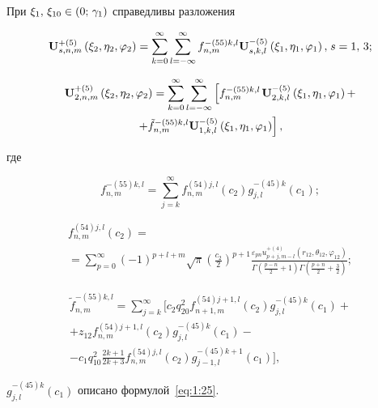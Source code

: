\begin{theorem}
При ${\xi _1},{\mkern 1mu} {\kern 1pt} {\xi _{10}} \in (0;{\mkern 1mu} {\kern 1pt} {\gamma _1})$ справедливы разложения

\begin{equation}\label{eq:1:52}
{\bf{U}}_{s,n,m}^{ + (5)}\left( {{\xi _2},{\eta _2},{\varphi _2}} \right) = \sum\limits_{k = 0}^\infty  {\sum\limits_{l =  - \infty }^\infty  {f_{n,m}^{ - (55)k,l}} } {\bf{U}}_{s,k,l}^{ - (5)}\left( {{\xi _1},{\eta _1},{\varphi _1}} \right), {\kern 1pt} s = 1,{\mkern 1mu} {\kern 1pt} 3;
\end{equation}

\begin{multline}\label{eq:1:53}
{\bf{U}}_{2,n,m}^{ + (5)}\left( {{\xi _2},{\eta _2},{\varphi _2}} \right) = \sum\limits_{k = 0}^\infty  {\sum\limits_{l =  - \infty }^\infty  {\left[ {f_{n,m}^{ - (55)k,l}} \right.} } {\bf{U}}_{2,k,l}^{ - (5)}\left( {{\xi _1},{\eta _1},{\varphi _1}} \right) + \\
\left. { + \tilde f_{n,m}^{ - (55)k,l}{\bf{U}}_{1,k,l}^{ - (5)}\left( {{\xi _1},{\eta _1},{\varphi _1}} \right)} \right],
\end{multline}

\noindent где

\begin{equation}\label{eq:1:54}
f_{n,m}^{ - (55)k,l} = \sum\limits_{j = k}^\infty  {f_{n,m}^{(54)j,l}({c_2})g_{j,l}^{ - (45)k}} ({c_1});
\end{equation}

\begin{multline}\label{eq:1:55}
f_{n,m}^{(54)j,l}({c_2}) = \\
= \sum\limits_{p = 0}^\infty  {{{( - 1)}^{p + l + m}}} \sqrt \pi  {\left( {\frac{{{c_2}}}{2}} \right)^{p + 1}}\frac{{{\varepsilon _{pn}}u_{p + j,m - l}^{ + (4)}\left( {{r_{12}},{\theta _{12}},{\varphi _{12}}} \right)}}{{\Gamma \left( {\frac{{p - n}}{2} + 1} \right)\Gamma \left( {\frac{{p + n}}{2} + \frac{3}{2}} \right)}};
\end{multline}

\begin{multline}\label{eq:1:56}
\tilde f_{n,m}^{ - (55)k,l} = \sum\limits_{j = k}^\infty  \bigg[ {c_2}q_{20}^2f_{n + 1,m}^{(54)j + 1,l}({c_2})g_{j,l}^{ - (45)k}({c_1}) + \\ 
+ {z_{12}}f_{n,m}^{(54)j + 1,l}({c_2})g_{j,l}^{ - (45)k}({c_1}) - \\
- {c_1}q_{10}^2\frac{{2k + 1}}{{2k + 3}}f_{n,m}^{(54)j,l}({c_2})g_{j - 1,l}^{ - (45)k + 1}({c_1}) \bigg],
\end{multline}

\noindent $g_{j,l}^{ - (45)k}({c_1})$ описано формулой~\eqref{eq:1:25}.
\end{theorem}

